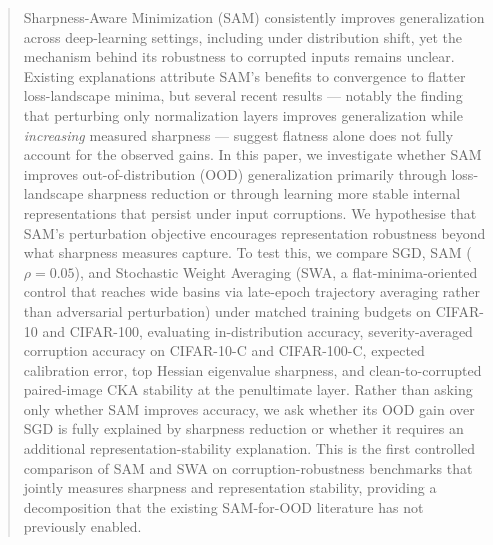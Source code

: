 \begin{abstract}
Sharpness-Aware Minimization (SAM) consistently improves generalization across deep-learning settings, including under distribution shift, yet the mechanism behind its robustness to corrupted inputs remains unclear. Existing explanations attribute SAM's benefits to convergence to flatter loss-landscape minima, but several recent results --- notably the finding that perturbing only normalization layers improves generalization while \emph{increasing} measured sharpness --- suggest flatness alone does not fully account for the observed gains. In this paper, we investigate whether SAM improves out-of-distribution (OOD) generalization primarily through loss-landscape sharpness reduction or through learning more stable internal representations that persist under input corruptions. We hypothesise that SAM's perturbation objective encourages representation robustness beyond what sharpness measures capture. To test this, we compare SGD, SAM ($\rho = 0.05$), and Stochastic Weight Averaging (SWA, a flat-minima-oriented control that reaches wide basins via late-epoch trajectory averaging rather than adversarial perturbation) under matched training budgets on CIFAR-10 and CIFAR-100, evaluating in-distribution accuracy, severity-averaged corruption accuracy on CIFAR-10-C and CIFAR-100-C, expected calibration error, top Hessian eigenvalue sharpness, and clean-to-corrupted paired-image CKA stability at the penultimate layer. Rather than asking only whether SAM improves accuracy, we ask whether its OOD gain over SGD is fully explained by sharpness reduction or whether it requires an additional representation-stability explanation. This is the first controlled comparison of SAM and SWA on corruption-robustness benchmarks that jointly measures sharpness and representation stability, providing a decomposition that the existing SAM-for-OOD literature has not previously enabled.
\end{abstract}
